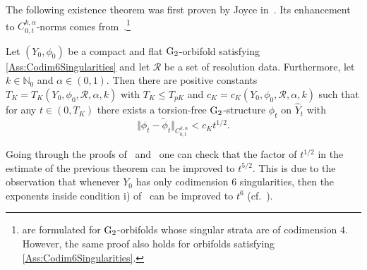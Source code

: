 \documentclass[11pt,a4paper]{scrartcl}
\newcommand{\VertWHt}[3]{\Vert_{C^{{#1},\alpha}_{{#2},t}{#3}}}
\newcommand{\G}{\textup{G}}
\numberwithin{equation}{section}
\theoremstyle{plain}
\theoremstyle{definition}
\theoremstyle{remark}
\begin{document}
The following existence theorem was first proven by Joyce in~\cite{Joyce-GeneralisedKummer1}. Its enhancement to $C^{k,\alpha}_{0,t}$-norms comes from~\cite[Proposition~4.20 and Remark~4.26]{Walpuski-InstantonsKummer}.\footnote{\cite[Proposition~4.20 and Remark~4.26]{Walpuski-InstantonsKummer} are formulated for $\G_2$-orbifolds whose singular strata are of codimension $4$. However, the same proof also holds for orbifolds satisfying \autoref{Ass:Codim6Singularities}.}
\begin{theorem}\label{theo:torsionfree_G2_structure}
Let $(Y_0,\phi_0)$ be a compact and flat $\G_2$-orbifold satisfying \autoref{Ass:Codim6Singularities} and let $\mathcal{R}$ be a set of resolution data. Furthermore, let $k\in \mathbb{N}_0$ and $\alpha \in (0,1)$. Then there are positive constants $T_{K} = T_{K}(Y_0,\phi_0,\mathcal{R},\alpha,k)$ with $T_{K} \leq T_{pK}$ and $c_{K}=c_{K}(Y_0,\phi_0,\mathcal{R},\alpha,k)$ such that for any $t\in (0,T_{K})$ there exists a torsion-free $\G_2$-structure $\phi_t$ on $\hat{Y}_t$ with \[ \Vert \phi_t - \tilde{\phi}_t \VertWHt{k}{0}{} < c_{K} t^{1/2}. \]
\end{theorem}

\begin{remark}\label{rem:improvedEstimates}
Going through the proofs of~\cite[Theorem~2.2.1]{Joyce-GeneralisedKummer2} and~\cite[Theorem~A]{Joyce-GeneralisedKummer1} one can check that the factor of $t^{1/2}$ in the estimate of the previous theorem can be improved to $t^{5/2}$. This is due to the observation that whenever $Y_0$ has only codimension $6$ singularities, then the exponents inside condition i) of~\cite[Theorem~A]{Joyce-GeneralisedKummer1} can be improved to $t^{6}$ (cf.~\cite[Section~11.5.5]{Joyce-Black}).
\end{remark}
\end{document}
